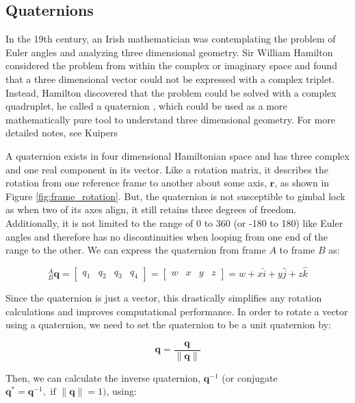 \subsection{Quaternions} 
In the 19th century, an Irish mathematician was contemplating the problem of Euler angles and analyzing three dimensional geometry.
Sir William Hamilton considered the problem from within the complex or imaginary space and found that a three dimensional vector could not be expressed with a complex triplet.
Instead, Hamilton discovered that the problem could be solved with a complex quadruplet, he called a quaternion \cite{Hamilton:1850}, which could be used as a more mathematically pure tool to understand three dimensional geometry.
For more detailed notes, see Kuipers \cite{Kuipers:2002}

A quaternion exists in four dimensional Hamiltonian space and has three complex and one real component in its vector. 
Like a rotation matrix, it describes the rotation from one reference frame to another about some axis, $\pmb{r}$, as shown in Figure \ref{fig:frame_rotation}.
But, the quaternion is not susceptible to gimbal lock as when two of its axes align, it still retains three degrees of freedom.
Additionally, it is not limited to the range of 0 to 360 (or -180 to 180) like Euler angles and therefore has no discontinuities when looping from one end of the range to the other.
We can express the quaternion from frame $A$ to frame $B$ as:

\begin{equation}
    {}^A_B \pmb{q} =
    \begin{bmatrix}
        q_1 & q_2 & q_3 & q_4
    \end{bmatrix} = 
    \begin{bmatrix}
        w & x & y & z
    \end{bmatrix} = 
    w + x\hat{i} + y\hat{j} + z\hat{k}
\end{equation}

Since the quaternion is just a vector, this drastically simplifies any rotation calculations and improves computational performance.
In order to rotate a vector using a quaternion, we need to set the quaternion to be a unit quaternion by:

\begin{equation}
    \pmb{q} = \frac{\pmb{q}}{\lVert\pmb{q}\rVert}
\end{equation}

Then, we can calculate the inverse quaternion, ${\pmb{q}}^{-1}$ (or conjugate $\pmb{q}^*=\pmb{q}^{-1}, \text{ if } \lVert\pmb{q}\rVert=1)$, using:

